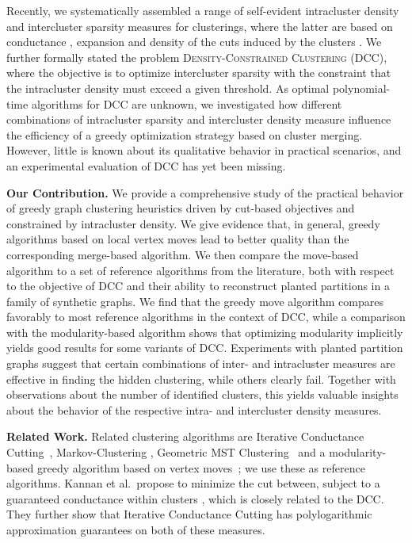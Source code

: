 \documentclass{llncs}
\newcommand{\andreapar}{\vspace*{.5ex}\par\noindent}
\begin{document}
Recently, we systematically assembled a range of self-evident intracluster density and intercluster sparsity measures for clusterings, where the latter are based on conductance , expansion  and density of the cuts induced by the clusters \cite{gsw-dcgc-11b}.
We further formally stated the problem \textsc{Density-Constrained Clustering} (DCC), where the objective is to optimize intercluster sparsity with the constraint that the intracluster density must exceed a given threshold.   
As optimal polynomial-time algorithms for \textsc{DCC} are unknown, we investigated how different combinations of intracluster sparsity and intercluster density measure influence the efficiency of a greedy optimization strategy based on cluster merging. 
However, little is known about its qualitative behavior in practical scenarios, and an experimental evaluation of \textsc{DCC} has yet been missing.
\andreapar\textbf{Our Contribution.}
We provide a comprehensive study of the practical behavior of greedy graph clustering heuristics driven by cut-based objectives and constrained by intracluster density. 
We give evidence that, in general, greedy algorithms based on local vertex moves lead to better quality than the corresponding merge-based algorithm. 
We then compare the move-based algorithm to a set of reference algorithms from the literature, both with respect to the objective of \textsc{DCC} and their ability to reconstruct planted partitions in a family of synthetic graphs. 
We find that the greedy move algorithm compares favorably to most reference algorithms in the context of \textsc{DCC}, while a comparison with the modularity-based algorithm shows that optimizing modularity implicitly yields good results for some variants of \textsc{DCC}.
Experiments with planted partition graphs suggest that certain combinations of inter- and intracluster measures are effective in finding the hidden clustering, while others clearly fail.
Together with observations about the number of identified clusters, this yields valuable insights about the behavior of the respective intra- and intercluster density measures.
\andreapar\textbf{Related Work.}
Related clustering algorithms are Iterative Conductance Cutting~\cite{kvv-cgds-00}, Markov-Clustering \cite{phd-dongen-02}, Geometric MST Clustering~\cite{bgw-egca-03} and a modularity-based greedy algorithm based on vertex moves~\cite{rn-m-11};
we use these as reference algorithms.
Kannan et al.\ propose to minimize the cut between, subject to a guaranteed conductance within clusters \cite{kvv-cgds-00}, which is closely related to the DCC. 
They further show that Iterative Conductance Cutting has polylogarithmic approximation guarantees on both of these measures.
\end{document}
